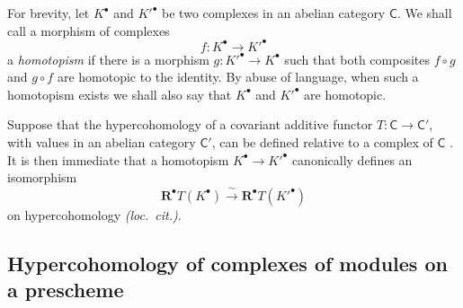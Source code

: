 \begin{env}[6.1.4]
\label{III.6.1.4}
For brevity, let $K^\bullet$ and $K'^\bullet$ be two complexes in
an abelian category $\mathsf{C}$.  We shall call a morphism of
complexes
\[
  f:K^\bullet\longrightarrow K'^\bullet
\]
a \emph{homotopism} if there is a morphism
$g:K'^\bullet\to K^\bullet$ such that both composites
$f\circ g$ and $g\circ f$ are homotopic to the identity.  By abuse
of language, when such a homotopism exists we shall also say that
$K^\bullet$ and $K'^\bullet$ are homotopic.

Suppose that the hypercohomology of a covariant additive functor
$T:\mathsf{C}\to\mathsf{C}'$, with values in an abelian category
$\mathsf{C}'$, can be defined relative to a complex of
$\mathsf{C}$ .  It is then immediate that a
homotopism $K^\bullet\to K'^\bullet$ canonically defines an
isomorphism
\[
  \mathbf{R}^\bullet T(K^\bullet)
  \xrightarrow{\ \sim\ }
  \mathbf{R}^\bullet T(K'^\bullet)
\]
on hypercohomology \emph{(loc.\ cit.)}.
\end{env}


\subsection{Hypercohomology of complexes of modules on a prescheme}
\label{subsection:III.6.2}

